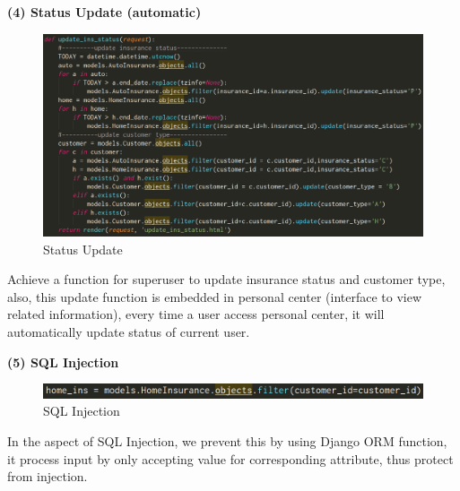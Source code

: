 \documentclass[12pt]{article}
\begin{document}
	\noindent\textbf{(4) Status Update (automatic)}
	\begin{figure}[H]
		\centering
		\includegraphics[scale=0.25]{update.png}
		\caption{Status Update}
	\end{figure}
	Achieve a function for superuser to update insurance status and customer type, also, this update function is embedded in personal center (interface to view related information), every time a user access personal center, it will automatically update status of current user.
	
	\newpage
	\noindent\textbf{(5) SQL Injection}
	\begin{figure}[H]
		\centering
		\includegraphics[scale=0.36]{injection.png}
		\caption{SQL Injection}
	\end{figure}
	In the aspect of SQL Injection, we prevent this by using Django ORM function, it process input by only accepting value for corresponding attribute, thus protect from injection.\\
    
\end{document}

